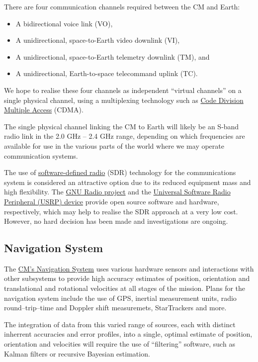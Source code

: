 \documentclass{report}
\begin{document}
There are four communication channels required between the CM and Earth:
\begin{itemize}
\item A bidirectional voice link (VO),
\item A unidirectional, space-to-Earth video downlink (VI),
\item A unidirectional, space-to-Earth telemetry downlink (TM), and
\item A unidirectional, Earth-to-space telecommand uplink (TC).
\end{itemize}
We hope to realise these four channels as independent ``virtual channels'' on a single physical channel, using a multiplexing technology such as \href{http://en.wikipedia.org/wiki/Code_division_multiple_access}{Code Division Multiple Access} (CDMA).

The single physical channel linking the CM to Earth will likely be an S-band radio link in the 2.0 GHz -- 2.4 GHz range, depending on which frequencies are available for use in the various parts of the world where we may operate communication systems.

The use of \href{http://en.wikipedia.org/wiki/Software_defined_radio}{software-defined radio} (SDR) technology for the communications system is considered an attractive option due to its reduced equipment mass and high flexibility.  The \href{http://gnuradio.org/redmine/wiki/gnuradio}{GNU Radio project} and the \href{http://www.ettus.com/products}{Universal Software Radio Peripheral (USRP) device} provide open source software and hardware, respectively, which may help to realise the SDR approach at a very low cost.  However, no hard decision has been made and investigations are ongoing.

\subsection{Navigation System}

The \href{http://cstart.org/wiki/CLLARE_CM_Navigation_System}{CM's Navigation System} uses various hardware sensors and interactions with other subsystems to provide high accuracy estimates of position, orientation and translational and rotational velocities at all stages of the mission.  Plans for the navigation system include the use of GPS, inertial measurement units, radio round--trip--time and Doppler shift measuremets, StarTrackers and more.

The integration of data from this varied range of sources, each with distinct inherrent accuracies and error profiles, into a single, optimal estimate of position, orientation and velocities will require the use of ``filtering'' software, such as Kalman filters or recursive Bayesian estimation.
\end{document}
